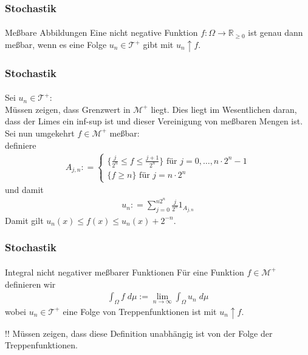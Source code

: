 \documentclass{beamer}
\begin{document}
\begin{frame}
    \frametitle{Stochastik}
\framesubtitle{}
    \begin{block}{Meßbare Abbildungen}
        Eine nicht negative Funktion $f:\Omega \to \mathbb{R}_{\geq 0}$ ist genau dann meßbar, wenn
        es eine Folge $u_n \in \mathcal{T}^+$ gibt mit $u_n \uparrow f$.
    \end{block}

\end{frame}


\begin{frame}
    \frametitle{Stochastik}
\framesubtitle{}
Sei $u_n \in \mathcal{T}^+$: \\
Müssen zeigen, dass Grenzwert  in $\mathcal{M}^+$ liegt.
Dies liegt im Wesentlichen daran, dass der Limes ein inf-sup ist und dieser Vereinigung von meßbaren Mengen ist.
\\
Sei nun umgekehrt $f \in \mathcal{M}^+$ meßbar: \\
definiere
\begin{align*}
    A_{j,n} : = \begin{cases} 
        \{ \frac{j}{2^n} \leq f \leq \frac{j+1}{2^n} \} \text{ für } j= 0, \dots, n \cdot 2^n -1 \\
        \{  f \geq n \} \text{ für } j= n \cdot 2^n 
    \end{cases}
\end{align*}
und damit 
\begin{align*}
    u_n : =  \sum_{j= 0}^{n2^n} \frac{j}{2^n} 1_{A_{j,n}}
\end{align*}
Damit gilt $u_n(x) \leq f(x) \leq u_n(x) +2^{-n}$.
\end{frame}



 
\begin{frame}
    \frametitle{Stochastik}
\framesubtitle{}
    \begin{block}{Integral nicht negativer meßbarer Funktionen}
        Für eine Funktion $f \in \mathcal{M}^+$ definieren wir
        \begin{align*}
            \int_{\Omega} f \;  d \mu := \lim_{n \to \infty} \int_{\Omega} u_n \; d \mu  
        \end{align*}
        wobei $u_n \in \mathcal{T}^+$ eine Folge von Treppenfunktionen ist mit 
        $u_n \uparrow f$.

        
    \end{block}
    \begin{block}{!!}
    Müssen zeigen, dass diese Definition unabhängig ist von der Folge der Treppenfunktionen.
\end{block}
\end{frame}
\end{document}
